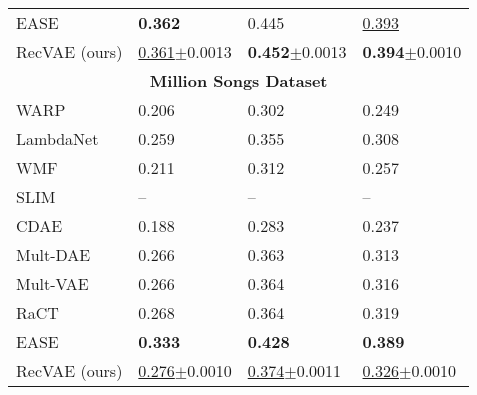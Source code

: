 \documentclass[sigconf,authorversion]{acmart}
\begin{document}
\begin{table}[!t]
\begin{tabular}{l|l|l|l}
EASE     \cite{steck2019embarrassingly}& \textbf{0.362} & 0.445 & \underline{0.393} \\
RecVAE (ours)                          & \underline{0.361}{\small$\pm$0.0013} & \textbf{0.452}{\small$\pm$0.0013} & \textbf{0.394}{\small$\pm$0.0010} \\ \midrule
\multicolumn{4}{c}{\bf Million Songs Dataset} \\\midrule
WARP     \cite{weston2011wsabie}       &  0.206 & 0.302 & 0.249 \\
LambdaNet\cite{burges2007learning}     &  0.259 & 0.355 & 0.308 \\
WMF      \cite{hu2008collaborative}    &  0.211 & 0.312 & 0.257 \\
SLIM     \cite{ning2011slim}           &  --    & --    & --    \\
CDAE     \cite{wu2016collaborative}    &  0.188 & 0.283 & 0.237 \\
Mult-DAE \cite{liang2018variational}   &  0.266 & 0.363 & 0.313 \\
Mult-VAE \cite{liang2018variational}   &  0.266 & 0.364 & 0.316 \\
RaCT     \cite{lobel2019towards}       &  0.268 & 0.364 & 0.319 \\
EASE     \cite{steck2019embarrassingly}&  \textbf{0.333} & \textbf{0.428} & \textbf{0.389} \\
RecVAE (ours)                          &  \underline{0.276}{\small$\pm$0.0010} & \underline{0.374}{\small$\pm$0.0011} & \underline{0.326}{\small$\pm$0.0010} \\ \bottomrule
\end{tabular}
\vspace{5pt}
\label{tab:vae-scores-last}\vspace{-.4cm}
\end{table}
\end{document}
